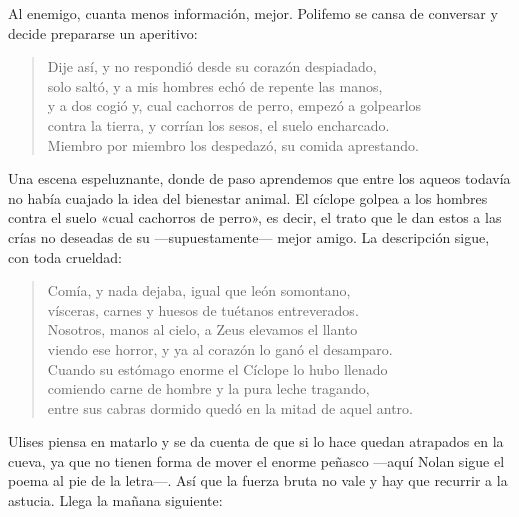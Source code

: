\documentclass[11pt,a4paper]{article}
\begin{document}
Al enemigo, cuanta menos información, mejor. Polifemo se cansa de conversar y decide prepararse un aperitivo:

\begin{verse}
Dije así, y no respondió desde su corazón despiadado,\\
solo saltó, y a mis hombres echó de repente las manos,\\
y a dos cogió y, cual cachorros de perro, empezó a golpearlos\\
contra la tierra, y corrían los sesos, el suelo encharcado.\\
Miembro por miembro los despedazó, su comida aprestando.
\end{verse}

Una escena espeluznante, donde de paso aprendemos que entre los aqueos todavía no había cuajado la idea del bienestar animal. El cíclope golpea a los hombres contra el suelo «cual cachorros de perro», es decir, el trato que le dan estos a las crías no deseadas de su ---supuestamente--- mejor amigo. La descripción sigue, con toda crueldad:

\begin{verse}
Comía, y nada dejaba, igual que león somontano,\\
vísceras, carnes y huesos de tuétanos entreverados.\\
Nosotros, manos al cielo, a Zeus elevamos el llanto\\
viendo ese horror, y ya al corazón lo ganó el desamparo.\\
Cuando su estómago enorme el Cíclope lo hubo llenado\\
comiendo carne de hombre y la pura leche tragando,\\
entre sus cabras dormido quedó en la mitad de aquel antro.
\end{verse}

Ulises piensa en matarlo y se da cuenta de que si lo hace quedan atrapados en la cueva, ya que no tienen forma de mover el enorme peñasco ---aquí Nolan sigue el poema al pie de la letra---. Así que la fuerza bruta no vale y hay que recurrir a la astucia. Llega la mañana siguiente:
\end{document}
